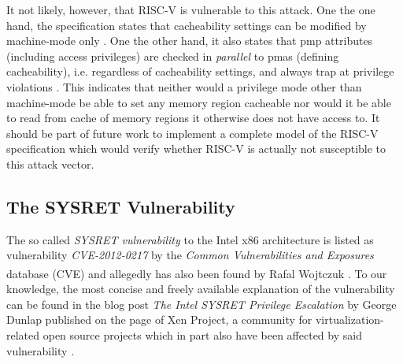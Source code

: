 It not likely, however, that RISC-V is vulnerable to this attack.
One the one hand, the specification states that cacheability settings can be modified by machine-mode only \cite[p.43]{RiscVISAP}.
One the other hand, it also states that \gls{pmp} attributes (including access privileges) are checked in \textit{parallel} to \glspl{pma} (defining cacheability), i.e. regardless of cacheability settings, and always trap at privilege violations \cite[44-45]{RiscVISAP}.
This indicates that neither would a privilege mode other than machine-mode be able to set any memory region cacheable nor would it be able to read from cache of memory regions it otherwise does not have access to.
It should be part of future work to implement a complete model of the RISC-V specification which would verify whether RISC-V is actually not susceptible to this attack vector.

\subsection{The SYSRET Vulnerability}
\label{sec:sysret}

The so called \textit{SYSRET vulnerability} to the Intel x86 architecture is listed as vulnerability \textit{CVE-2012-0217} by the \textit{Common Vulnerabilities and Exposures} database (CVE\textsuperscript{\textregistered}) \cite{SYSRET-vuln} and allegedly has also been found by Rafal Wojtczuk \cite{SYSRETFreeBSD,SYSRETDebian,SYSRETCert}.
To our knowledge, the most concise and freely available explanation of the vulnerability can be found in the blog post \textit{The Intel SYSRET Privilege Escalation} by George Dunlap published on the page of Xen Project, a community for virtualization-related open source projects which in part also have been affected by said vulnerability \cite{Dunlap19}.

